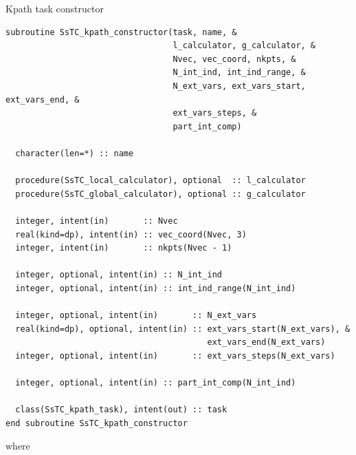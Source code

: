 \documentclass[10pt,a4paper]{article}
\begin{document}
\begin{codebox}{Kpath task constructor}
\begin{lstlisting}[caption={Interface of the ``kpath" constructor.},captionpos=b]
subroutine SsTC_kpath_constructor(task, name, &
                                  l_calculator, g_calculator, &
                                  Nvec, vec_coord, nkpts, &
                                  N_int_ind, int_ind_range, &
                                  N_ext_vars, ext_vars_start, ext_vars_end, &
                                  ext_vars_steps, &
                                  part_int_comp)

  character(len=*) :: name

  procedure(SsTC_local_calculator), optional  :: l_calculator
  procedure(SsTC_global_calculator), optional :: g_calculator

  integer, intent(in)       :: Nvec
  real(kind=dp), intent(in) :: vec_coord(Nvec, 3)
  integer, intent(in)       :: nkpts(Nvec - 1)

  integer, optional, intent(in) :: N_int_ind
  integer, optional, intent(in) :: int_ind_range(N_int_ind)

  integer, optional, intent(in)       :: N_ext_vars
  real(kind=dp), optional, intent(in) :: ext_vars_start(N_ext_vars), &
                                         ext_vars_end(N_ext_vars)
  integer, optional, intent(in)       :: ext_vars_steps(N_ext_vars)

  integer, optional, intent(in) :: part_int_comp(N_int_ind)

  class(SsTC_kpath_task), intent(out) :: task
end subroutine SsTC_kpath_constructor
\end{lstlisting}
\end{codebox}
where
\end{document}
